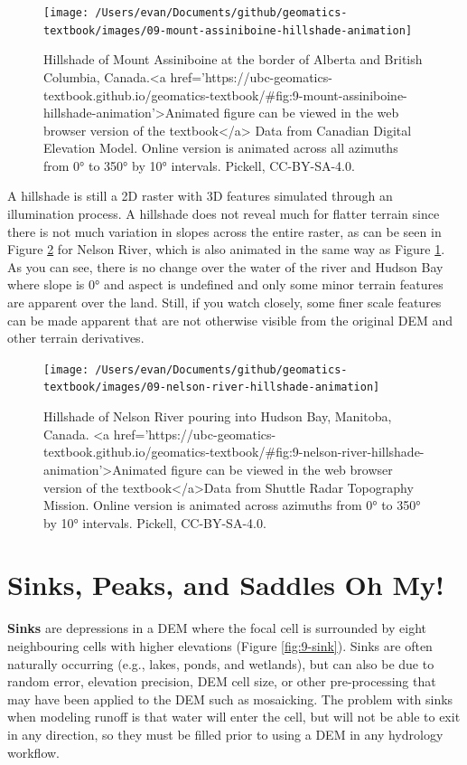 \documentclass[
]{book}
\begin{document}
\begin{figure}
\texttt{[image: /Users/evan/Documents/github/geomatics-textbook/images/09-mount-assiniboine-hillshade-animation]} \caption{Hillshade of Mount Assiniboine at the border of Alberta and British Columbia, Canada.<a href='https://ubc-geomatics-textbook.github.io/geomatics-textbook/#fig:9-mount-assiniboine-hillshade-animation'>Animated figure can be viewed in the web browser version of the textbook</a> Data from Canadian Digital Elevation Model. Online version is animated across all azimuths from 0° to 350° by 10° intervals. Pickell, CC-BY-SA-4.0.}\label{fig:9-mount-assiniboine-hillshade-animation}
\end{figure}

A hillshade is still a 2D raster with 3D features simulated through an illumination process. A hillshade does not reveal much for flatter terrain since there is not much variation in slopes across the entire raster, as can be seen in Figure \ref{fig:9-nelson-river-hillshade-animation} for Nelson River, which is also animated in the same way as Figure \ref{fig:9-mount-assiniboine-hillshade-animation}. As you can see, there is no change over the water of the river and Hudson Bay where slope is 0° and aspect is undefined and only some minor terrain features are apparent over the land. Still, if you watch closely, some finer scale features can be made apparent that are not otherwise visible from the original DEM and other terrain derivatives.

\begin{figure}
\texttt{[image: /Users/evan/Documents/github/geomatics-textbook/images/09-nelson-river-hillshade-animation]} \caption{Hillshade of Nelson River pouring into Hudson Bay, Manitoba, Canada. <a href='https://ubc-geomatics-textbook.github.io/geomatics-textbook/#fig:9-nelson-river-hillshade-animation'>Animated figure can be viewed in the web browser version of the textbook</a>Data from Shuttle Radar Topography Mission. Online version is animated across azimuths from 0° to 350° by 10° intervals. Pickell, CC-BY-SA-4.0.}\label{fig:9-nelson-river-hillshade-animation}
\end{figure}

\hypertarget{sinks-peaks-and-saddles-oh-my}{%
\section{Sinks, Peaks, and Saddles Oh My!}\label{sinks-peaks-and-saddles-oh-my}}

\textbf{Sinks} are depressions in a DEM where the focal cell is surrounded by eight neighbouring cells with higher elevations (Figure \ref{fig:9-sink}). Sinks are often naturally occurring (e.g., lakes, ponds, and wetlands), but can also be due to random error, elevation precision, DEM cell size, or other pre-processing that may have been applied to the DEM such as mosaicking. The problem with sinks when modeling runoff is that water will enter the cell, but will not be able to exit in any direction, so they must be filled prior to using a DEM in any hydrology workflow.
\end{document}
